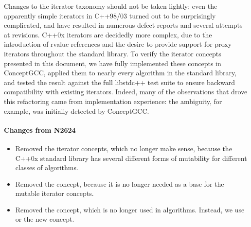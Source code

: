 \documentclass[american,twoside]{book}
\begin{document}
\begin{titlepage}
Changes to the iterator taxonomy should not be taken lightly; even the
apparently simple iterators in C++98/03 turned out to be surprisingly
complicated, and have resulted in numerous defect reports and several
attempts at revisions. C++0x iterators are decidedly more complex, due
to the introduction of rvalue references and the desire to provide
support for proxy iterators throughout the standard library. To verify
the iterator concepts presented in this document, we have fully
implemented these concepts in ConceptGCC, applied them to nearly every
algorithm in the standard library, and tested the result against the
full libstdc++ test suite to ensure backward compatibility with
existing iterators. Indeed, many of the observations that drove this
refactoring came from implementation experience: the 
ambiguity, for example, was initially detected by ConceptGCC. 

\paragraph*{Changes from N2624}
\begin{itemize}
\item Removed the  iterator concepts, which no
  longer make sense, because the C++0x standard library has several
  different forms of mutability for different classes of algorithms.
\item Removed the  concept, because it is
  no longer needed as a base for the mutable iterator concepts.
\item Removed the  concept, which is no
  longer used in algorithms. Instead, we use  or the
  new  concept.
\end{itemize}


\end{titlepage}

\pagestyle{fancy}
\fancyhead[LE,RO]{\textbf{\rightmark}}
\fancyhead[RE]{\textbf{\leftmark\hspace{1em}\thepage}}
\fancyhead[LO]{\textbf{\thepage\hspace{1em}\leftmark}}


\renewcommand{\sectionmark}[1]{\markright{\thesection\hspace{1em}#1}}
\renewcommand{\chaptermark}[1]{\markboth{#1}{}}
\end{document}
